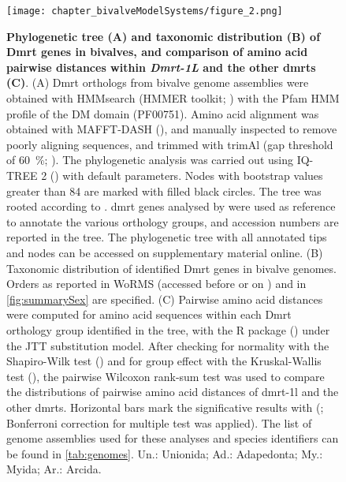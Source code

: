 \begin{figure}[t!]
	\centering
	\texttt{[image: chapter\_bivalveModelSystems/figure\_2.png]}
	\captionsetup[subfigure]{labelformat=nocaption}
	\begin{subfigure}{0\linewidth}
	\caption{}\label{fig:dmrt-A}
	\end{subfigure}%
	\begin{subfigure}{0\linewidth}
	\caption{}\label{fig:dmrt-B}
	\end{subfigure}%
	\begin{subfigure}{0\linewidth}
	\caption{}\label{fig:dmrt-C}
	\end{subfigure}%
	\caption[\textbf{Phylogenetic tree (A) and taxonomic distribution (B) of Dmrt genes in bivalves, and comparison of amino acid pairwise distances within \textit{Dmrt-1L} and the other \glspl{dmrt} (B)}]
	{
		\textbf{Phylogenetic tree (A) and taxonomic distribution (B) of Dmrt genes in bivalves, and comparison of amino acid pairwise distances within \textit{Dmrt-1L} and the other \glspl{dmrt} (C)}. (A) Dmrt orthologs from bivalve genome assemblies were obtained with HMMsearch (HMMER toolkit; ) with the Pfam HMM profile of the DM domain (PF00751). Amino acid alignment was obtained with MAFFT-DASH (), and manually inspected to remove poorly aligning sequences, and trimmed with trimAl (gap threshold of \qty{60}{\percent}; ). The phylogenetic analysis was carried out using IQ-TREE 2 () with default parameters. Nodes with bootstrap values greater than 84 are marked with filled black circles. The tree was rooted according to . \gls{dmrt} genes analysed by  were used as reference to annotate the various orthology groups, and accession numbers are reported in the tree. The phylogenetic tree with all annotated tips and nodes can be accessed on supplementary material online. (B) Taxonomic distribution of identified Dmrt genes in bivalve genomes. Orders as reported in WoRMS (accessed before or on ) and in \cref{fig:summarySex} are specified. (C) Pairwise amino acid distances were computed for amino acid sequences within each Dmrt orthology group identified in the tree, with the R package  () under the JTT substitution model. After checking for normality with the Shapiro-Wilk test () and for group effect with the Kruskal-Wallis test (), the pairwise Wilcoxon rank-sum test was used to compare the distributions of pairwise amino acid distances of \gls{dmrt-1l} and the other \glspl{dmrt}. Horizontal bars mark the significative results with  (\singlecurlyquotes{****}; Bonferroni correction for multiple test was applied). The list of genome assemblies used for these analyses and species identifiers can be found in \cref{tab:genomes}. Un.: Unionida; Ad.: Adapedonta; My.: Myida; Ar.: Arcida.
	}


\end{figure}

